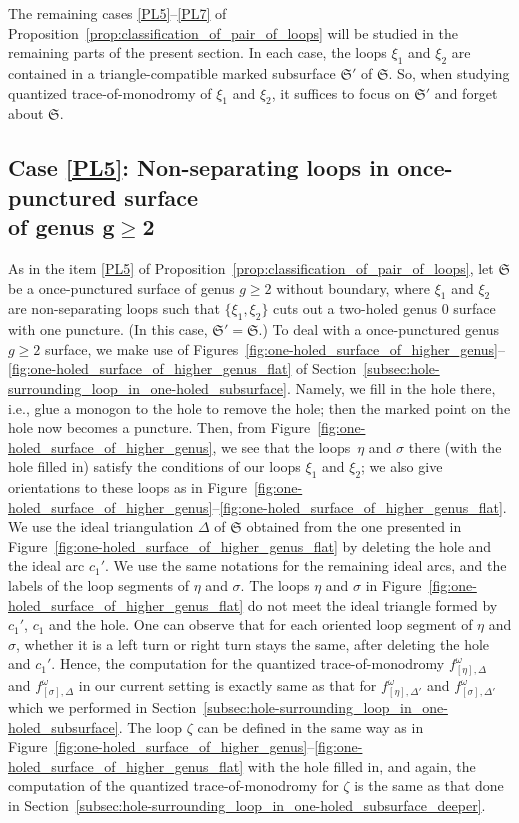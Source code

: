 \documentclass[10pt,a4paper]{amsart}
\numberwithin{equation}{section}
\theoremstyle{definition}
\begin{document}
The remaining cases \ref{PL5}--\ref{PL7} of Proposition~\ref{prop:classification_of_pair_of_loops} will be studied in the remaining parts of the present section. In each case, the loops $\xi_1$ and $\xi_2$ are contained in a triangle-compatible marked subsurface $\mathfrak{S}'$ of $\mathfrak{S}$. So, when studying quantized trace-of-monodromy of $\xi_1$ and $\xi_2$, it suffices to focus on $\mathfrak{S}'$ and forget about $\mathfrak{S}$.
\subsection[Case {\ref{PL5}}: Non-separating loops in once-punctured surface of genus g>=2]{Case {\ref{PL5}}: Non-separating loops in once-punctured surface\\ of genus $\boldsymbol{g\ge 2}$}
\label{subsec:Case5_commutativity}
As in the item \ref{PL5} of Proposition~\ref{prop:classification_of_pair_of_loops}, let $\mathfrak{S}$ be a once-punctured surface of genus $g\ge 2$ without boundary, where $\xi_1$ and $\xi_2$ are non-separating loops such that $\{\xi_1,\xi_2\}$ cuts out a two-holed genus $0$ surface with one puncture. (In this case, $\mathfrak{S}' = \mathfrak{S}$.)
To deal with a once-punctured genus $g\ge 2$ surface, we make use of Figures~\ref{fig:one-holed_surface_of_higher_genus}--\ref{fig:one-holed_surface_of_higher_genus_flat} of Section~\ref{subsec:hole-surrounding_loop_in_one-holed_subsurface}. Namely, we fill in the hole there, i.e., glue a monogon to the hole to remove the hole; then the marked point on the hole now becomes a puncture. Then, from Figure~\ref{fig:one-holed_surface_of_higher_genus}, we see that the loops~$\eta$ and $\sigma$ there (with the hole filled in) satisfy the conditions of our loops $\xi_1$ and $\xi_2$; we also give orientations to these loops as in Figure~\ref{fig:one-holed_surface_of_higher_genus}--\ref{fig:one-holed_surface_of_higher_genus_flat}. We use the ideal triangulation $\Delta$ of $\mathfrak{S}$ obtained from the one presented in Figure~\ref{fig:one-holed_surface_of_higher_genus_flat} by deleting the hole and the ideal arc $c_1'$. We use the same notations for the remaining ideal arcs, and the labels of the loop segments of $\eta$ and $\sigma$. The loops $\eta$ and $\sigma$ in Figure~\ref{fig:one-holed_surface_of_higher_genus_flat} do not meet the ideal triangle formed by $c_1'$, $c_1$ and the hole. One can observe that for each oriented loop segment of $\eta$ and $\sigma$, whether it is a left turn or right turn stays the same, after deleting the hole and $c_1'$. Hence, the computation for the quantized trace-of-monodromy $f^\omega_{[\eta],\Delta}$ and $f^\omega_{[\sigma],\Delta}$ in our current setting is exactly same as that for $f^\omega_{[\eta],\Delta'}$ and $f^\omega_{[\sigma],\Delta'}$ which we performed in Section~\ref{subsec:hole-surrounding_loop_in_one-holed_subsurface}. The loop $\zeta$ can be defined in the same way as in Figure~\ref{fig:one-holed_surface_of_higher_genus}--\ref{fig:one-holed_surface_of_higher_genus_flat} with the hole filled in, and again, the computation of the quantized trace-of-monodromy for $\zeta$ is the same as that done in Section~\ref{subsec:hole-surrounding_loop_in_one-holed_subsurface_deeper}.
\end{document}

